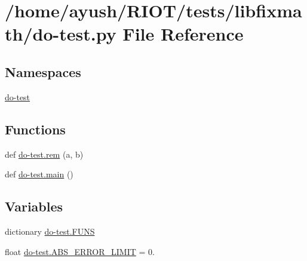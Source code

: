 \hypertarget{do-test_8py}{}\section{/home/ayush/\+R\+I\+O\+T/tests/libfixmath/do-\/test.py File Reference}
\label{do-test_8py}
\subsection*{Namespaces}
\begin{DoxyCompactItemize}
\item 
 \hyperlink{namespacedo-test}{do-\/test}
\end{DoxyCompactItemize}
\subsection*{Functions}
\begin{DoxyCompactItemize}
\item 
def \hyperlink{namespacedo-test_a1bdebfddd94ff5d15dccfe8c3da367f5}{do-\/test.\+rem} (a, b)
\item 
def \hyperlink{namespacedo-test_a3d4b60fc9b49e58d077e4c036a5f63c0}{do-\/test.\+main} ()
\end{DoxyCompactItemize}
\subsection*{Variables}
\begin{DoxyCompactItemize}
\item 
dictionary \hyperlink{namespacedo-test_ab5e68cf19230fadc42ed194f1f1e1360}{do-\/test.\+F\+U\+NS}
\item 
float \hyperlink{namespacedo-test_a9b7b485f0539fe63325f679d351ef485}{do-\/test.\+A\+B\+S\+\_\+\+E\+R\+R\+O\+R\+\_\+\+L\+I\+M\+IT} = 0.
\end{DoxyCompactItemize}
